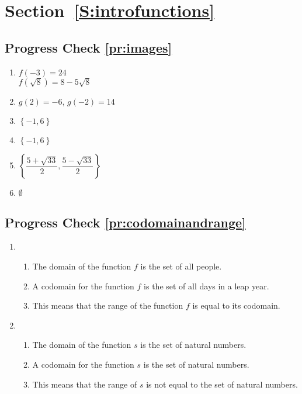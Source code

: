 \section*{Section~\ref{S:introfunctions}}

\subsection*{Progress Check \ref{pr:images}}
\begin{minipage}{2.3in}
\begin{enumerate}
\item $f ( -3 ) = 24$ \\$f ( \sqrt{8} ) = 8 - 5 \sqrt{8}$
\item $g ( 2 ) = -6$, $g ( -2 ) = 14$
\item $\left\{ -1, 6 \right\}$
\end{enumerate}
\end{minipage}
\begin{minipage}{2.3in}
\begin{enumerate} \setcounter{enumi}{3}
\item $\left\{ -1, 6 \right\}$
\item $\left\{ \dfrac{5 + \sqrt{33}}{2}, \dfrac{5 - \sqrt{33}}{2} \right\}$
\item $\emptyset$
\end{enumerate}
\end{minipage}

\subsection*{Progress Check \ref{pr:codomainandrange}}
\begin{enumerate}
\item 
\begin{enumerate}
  \item The domain of the function $f$ is the set of all people.
  \item A codomain for the function $f$ is the set of all days in a leap year.
  \item This means that the range of the function  $f$  is equal to its codomain.
\end{enumerate}

\item 
\begin{enumerate}
  \item The domain of the function $s$ is the set of natural numbers.
  \item A codomain for the function $s$ is the set of natural numbers.
  \item This means that the range of  $s$  is not equal to the set of natural numbers.
\end{enumerate}
\end{enumerate}


